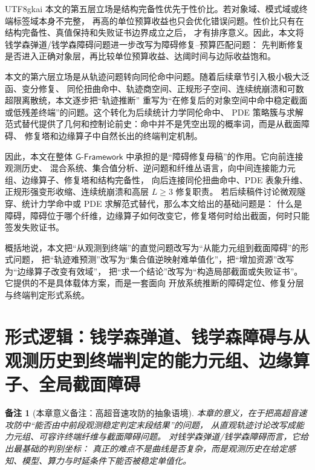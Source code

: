 \documentclass[12pt]{article}
\newtheorem{remark}{备注}[section]
\newcommand{\GFramework}{\textsf{G-Framework}}
\begin{document}
\begin{CJK*}{UTF8}{gkai}
本文的第五层立场是结构完备性优先于性价比。若对象域、模式域或终端标签域本身不完整，
再高的单位预算收益也只会优化错误问题。性价比只有在结构完备性、真值保持和失败证书边界成立之后，
才有排序意义。因此，本文将钱学森弹道/钱学森障碍问题进一步改写为障碍修复--预算匹配问题：
先判断修复是否进入正确对象层，再比较单位预算收益、达阈时间与边际收益饱和。

本文的第六层立场是从轨迹问题转向同伦命中问题。随着后续章节引入极小极大泛函、变分修复、
同伦扭曲命中、轨迹商空间、正规形子空间、连续统崩溃和可数超限离散统，本文逐步把“轨迹推断”
重写为“在修复后的对象空间中命中稳定截面或低残差终端”的问题。这个转化为后续统计力学同伦命中、
PDE 策略簇与求解范式替代提供了几何和控制论前史：命中并不是凭空出现的概率词，而是从截面障碍、
修复塔和边缘算子中自然长出的终端判定机制。

因此，本文在整体 \(\GFramework{}\) 中承担的是“障碍修复母稿”的作用。它向前连接观测历史、
混合系统、集合值分析、逆问题和纤维丛语言，向中间连接能力元组、边缘算子、修复塔和结构完备性，
向后连接同伦扭曲命中、PDE 表象升维、正规形强变形收缩、连续统崩溃和高层 \(L\ge3\) 修复职责。
若后续稿件讨论微观隧穿、统计力学命中或 PDE 求解范式替代，那么本文给出的基础问题是：
什么是障碍，障碍位于哪个纤维，边缘算子如何改变它，修复塔何时给出截面，何时只能签发失败证书。

概括地说，本文把“从观测到终端”的直觉问题改写为“从能力元组到截面障碍”的形式问题，
把“轨迹难预测”改写为“集合值逆映射难单值化”，把“增加资源”改写为“边缘算子改变有效域”，
把“求一个结论”改写为“构造局部截面或失败证书”。它提供的不是具体载体方案，而是一套面向
开放系统推断的障碍定位、修复分层与终端判定形式系统。

\setcounter{tocdepth}{3}
\setcounter{secnumdepth}{3}
\tableofcontents
\clearpage

\section{形式逻辑：钱学森弹道、钱学森障碍与从观测历史到终端判定的能力元组、边缘算子、全局截面障碍}
\label{sec:tex1-ch1}

\begin{remark}[本章意义备注：高超音速攻防的抽象语境]
本章的意义，在于把高超音速攻防中“能否由中前段观测稳定判定末段结果”的问题，
从直观轨迹讨论改写成能力元组、可容许终端纤维与截面障碍问题。
对钱学森弹道/钱学森障碍而言，它给出最基础的判别坐标：
真正的难点不是曲线是否复杂，而是观测历史在给定感知、模型、算力与时延条件下能否被稳定单值化。
\end{remark}


\end{CJK*}
\end{document}
